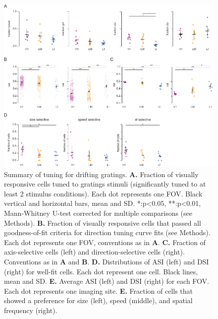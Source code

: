 \begin{figure}[t!]
\includegraphics[width=\textwidth]{figures/supplemental/fig_s11_gratings_aggregate/fig_s11_gratings_aggregate.pdf}
    \vspace{.1in}
    \caption[Aggregated gratings metrics]{Summary of tuning for drifting gratings.
    \textbf{A.} Fraction of visually responsive cells tuned to gratings stimuli (significantly tuned to at least 2 stimulus conditions). Each dot represents one FOV. Black vertical and horizontal bars, mean and SD. *:p<0.05, **:p<0.01, Mann-Whitney U-test corrected for multiple comparisons (see Methods).
    \textbf{B.} Fraction of visually responsive cells that passed all goodness-of-fit criteria for direction tuning curve fits (see Methods). Each dot represents one FOV, conventions as in \textbf{A}.
    \textbf{C.} Fraction of axis-selective cells (left) and direction-selective cells (right). Conventions as in \textbf{A} and \textbf{B}.
    \textbf{D.} Distributions of ASI (left) and DSI (right) for well-fit cells. Each dot represent one cell. Black lines, mean and SD.
    \textbf{E.} Average ASI (left) and DSI (right) for each FOV. Each dot represents one imaging site.
    \textbf{E.} Fraction of cells that showed a preference for size (left), speed (middle), and spatial frequency (right). 
    \label{supfig:gratings_aggregate}}
\end{figure}


